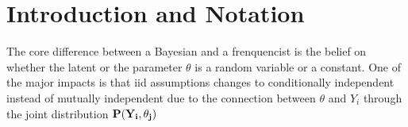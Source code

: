 \chapter{Introduction and Notation}

The core difference between a Bayesian and a frenquencist is the belief on whether the latent or the parameter $\theta$ is a random variable or a constant. One of the major impacts is that iid assumptions changes to conditionally independent instead of mutually independent due to the connection between $\theta$ and $Y_i$ through the joint distribution $\bf{P}(Y_i, \theta_j)$